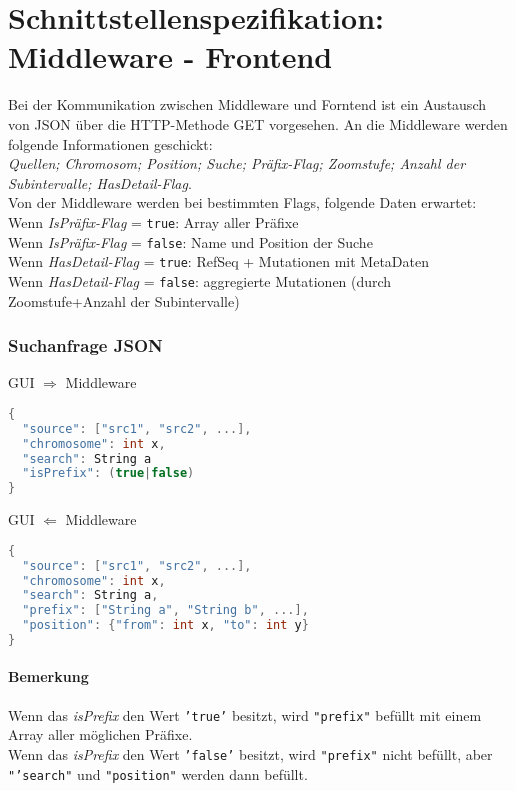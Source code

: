 \section{Schnittstellenspezifikation: Middleware - Frontend}
Bei der Kommunikation zwischen Middleware und Forntend ist ein Austausch von JSON über die HTTP-Methode GET vorgesehen.
An die Middleware werden folgende Informationen geschickt:
\\
\textit{Quellen; Chromosom; Position; Suche; Präfix-Flag; Zoomstufe; Anzahl der Subintervalle; HasDetail-Flag}.\\
Von der Middleware werden bei bestimmten Flags, folgende Daten erwartet:
\\
Wenn \textit{IsPräfix-Flag} = \texttt{true}: Array aller Präfixe\\
Wenn \textit{IsPräfix-Flag} = \texttt{false}: Name und Position der Suche\\[1em]
Wenn \textit{HasDetail-Flag} = \texttt{true}: RefSeq + Mutationen mit MetaDaten\\
Wenn \textit{HasDetail-Flag} = \texttt{false}: aggregierte Mutationen (durch Zoomstufe+Anzahl der Subintervalle)

\subsubsection{Suchanfrage JSON}
GUI $\Rightarrow$ Middleware
\begin{lstlisting}[language=c,
commentstyle=\fontsize{12}{14.4}\ttfamily,
basicstyle=\ttfamily\fontsize{10}{12}\selectfont, showstringspaces=false]
{
  "source": ["src1", "src2", ...],
  "chromosome": int x,
  "search": String a
  "isPrefix": (true|false)
}
\end{lstlisting}
GUI $\Leftarrow$ Middleware
\begin{lstlisting}[language=c,
commentstyle=\fontsize{12}{14.4}\ttfamily,
basicstyle=\ttfamily\fontsize{10}{12}\selectfont, showstringspaces=false]
{
  "source": ["src1", "src2", ...],
  "chromosome": int x,
  "search": String a,
  "prefix": ["String a", "String b", ...],
  "position": {"from": int x, "to": int y}
}
\end{lstlisting}
\paragraph{Bemerkung} Wenn das \textit{isPrefix} den Wert \texttt{'true'} besitzt, wird \texttt{"prefix"} befüllt mit einem Array aller möglichen Präfixe.\\
Wenn das \textit{isPrefix} den Wert \texttt{'false'} besitzt, wird \texttt{"prefix"} nicht befüllt, aber \texttt{"'search"} und \texttt{"position"} werden dann befüllt.
\newpage

